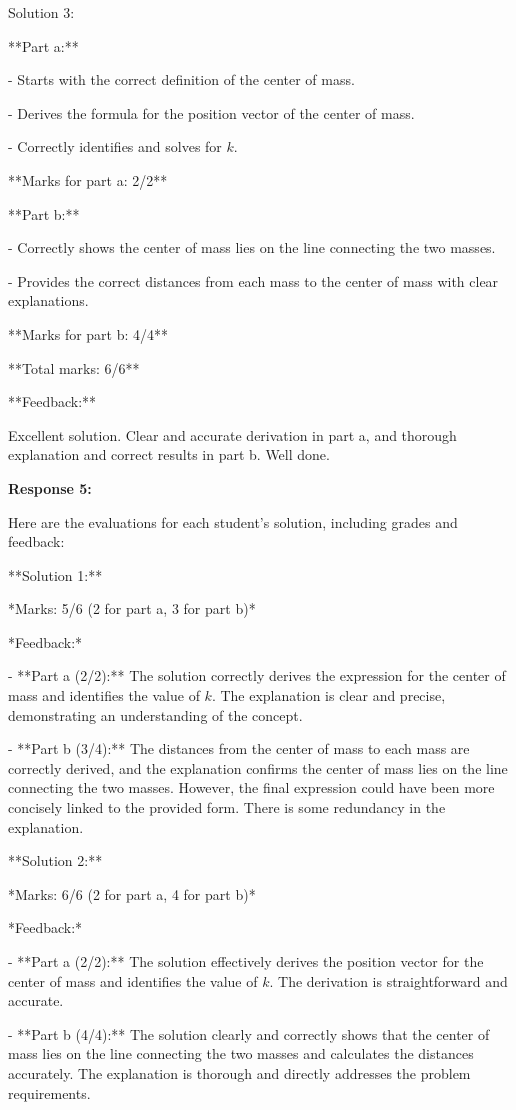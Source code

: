 \documentclass[a4paper,11pt]{article}
\begin{document}
Solution 3:

**Part a:**

- Starts with the correct definition of the center of mass.

- Derives the formula for the position vector of the center of mass.

- Correctly identifies and solves for \( k \).

**Marks for part a: 2/2**

**Part b:**

- Correctly shows the center of mass lies on the line connecting the two masses.

- Provides the correct distances from each mass to the center of mass with clear explanations.

**Marks for part b: 4/4**

**Total marks: 6/6**

**Feedback:**

Excellent solution. Clear and accurate derivation in part a, and thorough explanation and correct results in part b. Well done.

\bigskip
\textbf{Response 5:}

Here are the evaluations for each student's solution, including grades and feedback:

**Solution 1:**

*Marks: 5/6 (2 for part a, 3 for part b)*

*Feedback:*

- **Part a (2/2):** The solution correctly derives the expression for the center of mass and identifies the value of \( k \). The explanation is clear and precise, demonstrating an understanding of the concept.

- **Part b (3/4):** The distances from the center of mass to each mass are correctly derived, and the explanation confirms the center of mass lies on the line connecting the two masses. However, the final expression could have been more concisely linked to the provided form. There is some redundancy in the explanation.

**Solution 2:**

*Marks: 6/6 (2 for part a, 4 for part b)*

*Feedback:*

- **Part a (2/2):** The solution effectively derives the position vector for the center of mass and identifies the value of \( k \). The derivation is straightforward and accurate.

- **Part b (4/4):** The solution clearly and correctly shows that the center of mass lies on the line connecting the two masses and calculates the distances accurately. The explanation is thorough and directly addresses the problem requirements.
\end{document}
